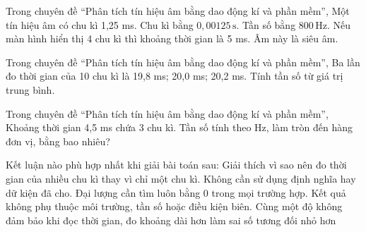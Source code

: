 \begin{ex}
Trong chuyên đề “Phân tích tín hiệu âm bằng dao động kí và phần mềm”, Một tín hiệu âm có chu kì 1,25 ms.
\choiceTF
{\True Chu kì bằng $0,00125\,\text{s}$.}
{\True Tần số bằng $800\,\text{Hz}$.}
{\True Nếu màn hình hiển thị 4 chu kì thì khoảng thời gian là 5 ms.}
{Âm này là siêu âm.}
\end{ex}

\begin{ex}
Trong chuyên đề “Phân tích tín hiệu âm bằng dao động kí và phần mềm”, Ba lần đo thời gian của 10 chu kì là 19,8 ms; 20,0 ms; 20,2 ms. Tính tần số từ giá trị trung bình.
\choiceTF

\end{ex}

\begin{ex}
Trong chuyên đề “Phân tích tín hiệu âm bằng dao động kí và phần mềm”, Khoảng thời gian 4,5 ms chứa 3 chu kì. Tần số tính theo Hz, làm tròn đến hàng đơn vị, bằng bao nhiêu?
\end{ex}

\begin{ex}
Kết luận nào phù hợp nhất khi giải bài toán sau: Giải thích vì sao nên đo thời gian của nhiều chu kì thay vì chỉ một chu kì.
\choice
{Không cần sử dụng định nghĩa hay dữ kiện đã cho.}
{Đại lượng cần tìm luôn bằng 0 trong mọi trường hợp.}
{Kết quả không phụ thuộc môi trường, tần số hoặc điều kiện biên.}
{\True Cùng một độ không đảm bảo khi đọc thời gian, đo khoảng dài hơn làm sai số tương đối nhỏ hơn}
\end{ex}

